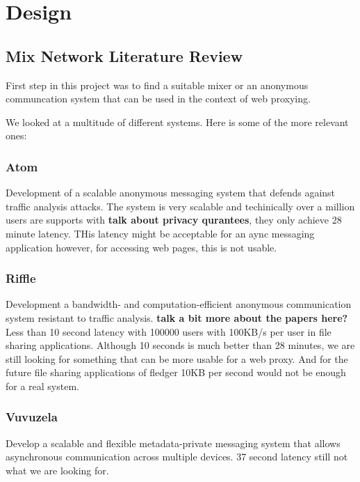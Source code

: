 \documentclass[a4paper,11pt,oneside]{report}
\begin{document}
\chapter{Design}



\section{Mix Network Literature Review}

First step in this project was to find a suitable mixer or an anonymous communcation system that can be used in the context of web proxying.

We looked at a multitude of different systems. Here is some of the more relevant ones:

\subsection{Atom}
Development of a scalable anonymous messaging system that defends against traffic analysis attacks. The system is very scalable and techinically over a million users are supports with \textbf{talk about privacy qurantees}, they only achieve 28 minute latency. THis latency might be acceptable for an aync messaging application however, for accessing web pages, this is not usable.

\subsection{Riffle}
Development a bandwidth- and computation-efficient anonymous communication system resistant to traffic analysis. \textbf{talk a bit more about the papers here?} Less than 10 second latency with 100000 users with 100KB/s per user in file sharing applications.  Although 10 seconds is much better than 28 minutes, we are still looking for something that can be more usable for a web proxy. And for the future file sharing applications of fledger 10KB per second would not be enough for a real system.
\subsection{Vuvuzela}
Develop a scalable and flexible metadata-private messaging system that allows asynchronous communication across multiple devices. 37 second latency still not what we are looking for. 
\end{document}
